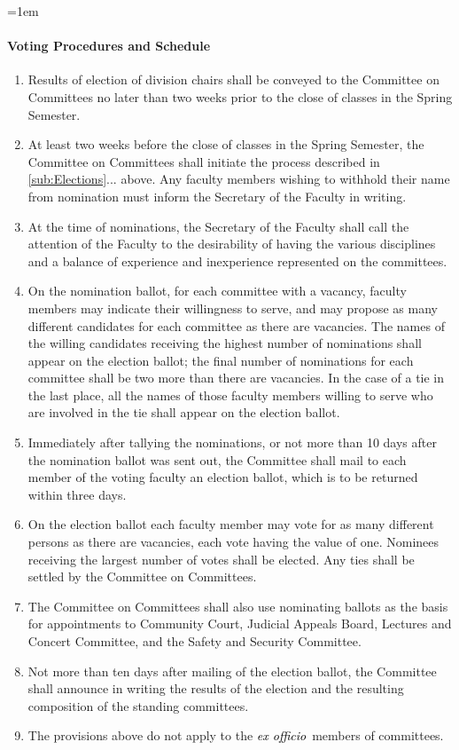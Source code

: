 \documentclass{manual}
\newcommand{\keyword}[1]{\textcolor{black}{#1}}
\newcommand{\exoff}{\keyword{\textit{ex officio}}~}
\let\oldparagraph\paragraph
\renewcommand\paragraph{\leftskip=1em\oldparagraph}
\newcommand{\itemLevelA}{\alph*.}
\newcommand{\itemRefA}{\alph*}
\begin{document}
\paragraph{Voting Procedures and Schedule}
\begin{enumerate}[label=\itemLevelA,ref=\itemRefA]
\item Results of election of division chairs shall be conveyed to the Committee on Committees no later than two weeks prior to the close of classes in the Spring Semester.
\item At least two weeks before the close of classes in the Spring Semester, the Committee on Committees shall initiate the process described in \cref{sub:Elections}... above. Any faculty members wishing to withhold their name from nomination must inform the Secretary of the Faculty in writing.
\item At the time of nominations, the Secretary of the Faculty shall call the attention of the Faculty to the desirability of having the various disciplines and a balance of experience and inexperience represented on the committees.
\item On the nomination ballot, for each committee with a vacancy,  faculty members may indicate their willingness to serve, and may propose as many different candidates for each committee as there are vacancies. The names of the willing candidates receiving the highest number of nominations shall appear on the election ballot; the final number of nominations for each committee shall be two more than there are vacancies. In the case of a tie in the last place, all the names of those faculty members willing to serve who are involved in the tie shall appear on the election ballot.
\item Immediately after tallying the nominations, or not more than 10 days after the nomination ballot was sent out, the Committee shall mail to each member of the voting faculty an election ballot, which is to be returned within three days.
\item On the election ballot each faculty member may vote for as many different persons as there are vacancies, each vote having the value of one. Nominees receiving the largest number of votes shall be elected. Any ties shall be settled by the Committee on Committees.
\item The Committee on Committees shall also use nominating ballots as the basis for appointments to Community Court, Judicial Appeals Board, Lectures and Concert Committee, and the Safety and Security Committee.
\item Not more than ten days after mailing of the election ballot, the Committee shall announce in writing the results of the election and the resulting composition of the standing committees.
\item The provisions above do not apply to the \exoff members of committees. 
\end{enumerate}
\end{document}
